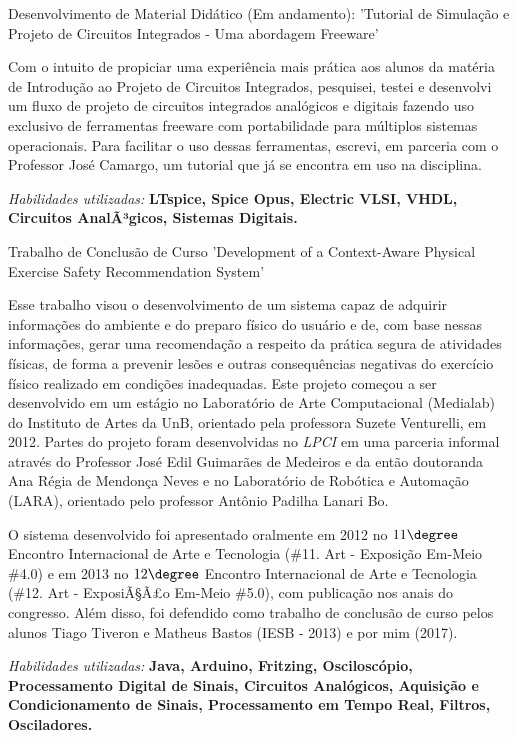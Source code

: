 \documentclass[a4paper]{twentysecondcv} %
\begin{document}
\begin{twenty}
\twentyitem
{Desenvolvimento de Material Didático (Em andamento):}
{'Tutorial de Simulação e Projeto de Circuitos Integrados - Uma abordagem 
Freeware'}
{}
{\hspace{8pt} Com o intuito de propiciar uma experiência mais prática aos alunos 
da matéria de Introdução ao Projeto de Circuitos Integrados, pesquisei, testei e 
desenvolvi um fluxo de projeto de circuitos integrados analógicos e digitais 
fazendo uso exclusivo de ferramentas freeware com portabilidade para múltiplos 
sistemas operacionais. Para facilitar o uso dessas ferramentas, escrevi, 
em parceria com o Professor José Camargo, um tutorial que já se encontra em uso 
na disciplina.

\hspace{8pt}\textit{Habilidades utilizadas:} \textbf{LTspice, Spice Opus, 
Electric VLSI, VHDL, Circuitos AnalÃ³gicos, Sistemas Digitais.\\}}

\twentyitem
{Trabalho de Conclusão de Curso}
{'Development of a Context-Aware Physical Exercise Safety Recommendation System'}
{}
{\hspace{8pt}Esse trabalho visou o desenvolvimento de um sistema capaz de adquirir 
informações do ambiente e do preparo físico do usuário e de, com base nessas 
informações, gerar uma recomendação a respeito da prática segura de atividades 
físicas, de forma a prevenir lesões e outras consequências negativas do exercício 
físico realizado em condições inadequadas. Este projeto começou a ser desenvolvido
em um estágio no Laboratório de Arte Computacional (Medialab) do Instituto de 
Artes da UnB, orientado pela professora Suzete Venturelli, em 2012. Partes do 
projeto foram desenvolvidas no \textit{LPCI} em uma parceria informal através do 
Professor José Edil Guimarães de Medeiros e da então doutoranda Ana Régia de 
Mendonça Neves e no Laboratório de Robótica e Automação (LARA), orientado pelo 
professor Antônio Padilha Lanari Bo.

\hspace{8pt}O sistema desenvolvido foi apresentado oralmente em 2012 no 
$11\degree$ Encontro Internacional de Arte e Tecnologia (\#11. Art - Exposição 
Em-Meio \#4.0) e em 2013 no $12\degree$ Encontro Internacional de Arte e 
Tecnologia (\#12. Art - ExposiÃ§Ã£o Em-Meio \#5.0), com publicação nos anais do 
congresso. Além disso, foi defendido como trabalho de conclusão de curso pelos 
alunos Tiago Tiveron e Matheus Bastos (IESB - 2013) e por mim (2017).

\hspace{8pt}\textit{Habilidades utilizadas: }\textbf{Java, Arduino, Fritzing,
Osciloscópio, Processamento Digital de Sinais, Circuitos Analógicos, Aquisição e 
Condicionamento de Sinais, Processamento em Tempo Real, Filtros, Osciladores.}
}\\



\end{twenty}
\end{document}
